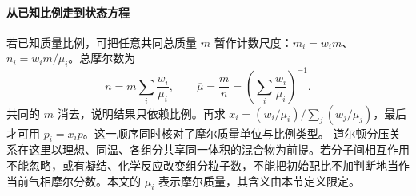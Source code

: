 \paragraph{从已知比例走到状态方程}
若已知质量比例，可把任意共同总质量 $m$ 暂作计数尺度：$m_i=w_im$、$n_i=w_im/\mu_i$。总摩尔数为
\[
 n=m\sum_i\frac{w_i}{\mu_i},\qquad
 \overline\mu=\frac mn=\left(\sum_i\frac{w_i}{\mu_i}\right)^{-1}.
\]
共同的 $m$ 消去，说明结果只依赖比例。再求 $x_i=(w_i/\mu_i)/\sum_j(w_j/\mu_j)$，最后才可用 $p_i=x_ip$。这一顺序同时核对了摩尔质量单位与比例类型。
道尔顿分压关系在这里以理想、同温、各组分共享同一体积的混合物为前提。若分子间相互作用不能忽略，或有凝结、化学反应改变组分粒子数，不能把初始配比不加判断地当作当前气相摩尔分数。本文的 $\mu_i$ 表示摩尔质量，其含义由本节定义限定。
